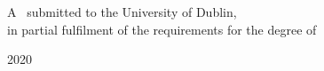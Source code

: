\begin{titlepage}
 A \typeofthesis\ submitted to the University of Dublin,\\
in partial fulfilment of the requirements for the degree of\\
\degree
\newline\newline\newline

{\large 2020}\\[2cm] %


\vfill %

\end{titlepage}